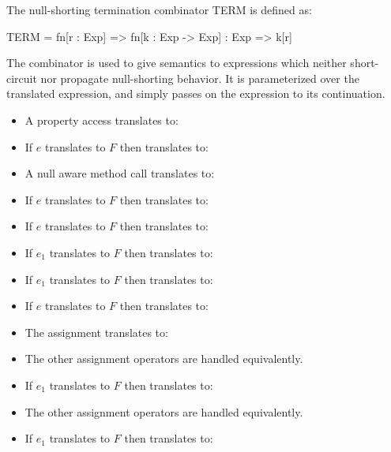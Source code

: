 \documentclass[makeidx]{article}
\begin{document}
The null-shorting termination combinator TERM is defined as:
\begin{dartCode}
  TERM = fn[r : Exp] => fn[k : Exp -> Exp] : Exp => k[r]
\end{dartCode}

The  combinator is used to give semantics to expressions which neither
short-circuit nor propagate null-shorting behavior.  It is parameterized over
the translated expression, and simply passes on the expression to its
continuation.

\begin{itemize}
\item A property access  translates to:
\item If $e$ translates to $F$ then  translates to:
\item A null aware method call  translates to:
\item If $e$ translates to $F$ then  translates to:
\item If $e$ translates to $F$ then  translates to:
\item If $e_1$ translates to $F$ then  translates to:
\item If $e_1$ translates to $F$ then  translates to:
\item If $e$ translates to $F$ then  translates to:
\item The assignment  translates to:
\item The other assignment operators are handled equivalently.
\item If $e_1$ translates to $F$ then  translates to:
\item The other assignment operators are handled equivalently.
\item If $e_1$ translates to $F$ then  translates to:

\end{itemize}
\end{document}
